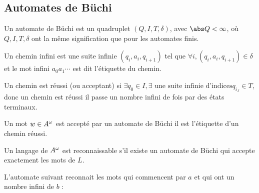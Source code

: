 \subsection{Automates de Büchi}

\begin{definition}
	Un automate de Büchi est un quadruplet $(Q,I,T,\delta)$, avec $\abs Q < \infty$, où
	$Q,I,T,\delta$ ont la même signification que pour les automates finis.
\end{definition}

\begin{definition}
	Un chemin infini est une suite infinie $(q_i,a_i,q_{i+1})$ tel que $\forall i, (q_i,a_i,q_{i+1}) \in \delta$ et le mot
	infini $a_0a_1\cdots$ est dit l'étiquette du chemin.
\end{definition}


\begin{definition}
	Un chemin est réussi (ou acceptant) si $\exists q_0 \in I, \exists \text{ une suite infinie d'indices} q_{i_J} \in T$,
	donc un chemin est réussi \ssi il passe un nombre infini de fois par des états terminaux.
\end{definition}

\begin{definition}
	Un mot $w \in A^{\omega}$ est accepté par un automate de Büchi \ssi il est l'étiquette d'un chemin réussi.
\end{definition}


\begin{definition}
	Un langage de $A^{\omega}$ est reconnaissable s'il existe un automate de Büchi qui accepte exactement les mots de $L$.
\end{definition}


\begin{exemple}
	L'automate suivant reconnait les mots qui commencent par $a$ et qui ont un nombre infini de $b$ :

	\begin{automata}
	\end{automata}
\end{exemple}


